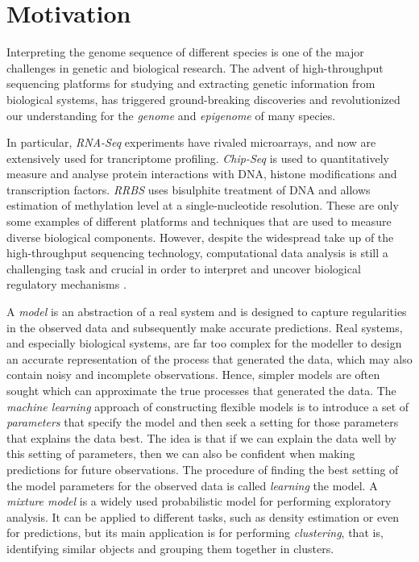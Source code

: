 \section{Motivation} \label{motivation-intro-l}
Interpreting the genome sequence of different species is one of the major challenges in genetic and biological research. The advent of high-throughput sequencing platforms for studying and extracting genetic information from biological systems, has triggered ground-breaking discoveries and revolutionized our understanding for the \emph{genome} and \emph{epigenome} of many species. 

In particular, \emph{RNA-Seq} experiments \citep{Marioni2008} have rivaled microarrays, and now are extensively used for trancriptome profiling. \emph{Chip-Seq} \citep{Park2009} is used to quantitatively measure and analyse protein interactions with DNA, \ie histone modifications and transcription factors. \emph{RRBS} \citep{Meissner2005} uses bisulphite treatment of DNA and allows estimation of methylation level at a single-nucleotide resolution. These are only some examples of different platforms and techniques that are used to measure diverse biological components. However, despite the widespread take up of the high-throughput sequencing technology, computational data analysis is still a challenging task and crucial in order to interpret and uncover biological regulatory mechanisms \citep{Park2009}.

A \emph{model} is an abstraction of a real system and is designed to capture regularities in the observed data and subsequently make accurate predictions. Real systems, and especially biological systems, are far too complex for the modeller to design an accurate representation of the process that generated the data, which may also contain noisy and incomplete observations. Hence, simpler models are often sought which can approximate the true processes that generated the data. The \emph{machine learning} approach of constructing flexible models is to introduce a set of \emph{parameters} that specify the model and then seek a setting for those parameters that explains the data best. The idea is that if we can explain the data well by this setting of parameters, then we can also be confident when making predictions for future observations. The procedure of finding the best setting of the model parameters for the observed data is called \emph{learning} the model. A \emph{mixture model} is a widely used probabilistic model for performing exploratory analysis. It can be applied to different tasks, such as density estimation or even for predictions, but its main application is for performing \emph{clustering}, that is, identifying similar objects and grouping them together in clusters. 

